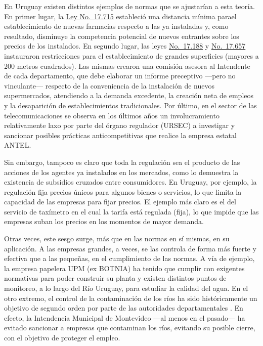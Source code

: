 \documentclass[
  12pt,
  spanish,
]{book}
\begin{document}
En Uruguay existen distintos ejemplos de normas que se ajustarían a esta teoría. En primer lugar, la \href{http://www.parlamento.gub.uy/leyes/AccesoTextoLey.asp?Ley=17715\&Anchor=}{Ley No.~17.715} estableció una distancia mínima parael establecimiento de nuevas farmacias respecto a las ya instaladas y, como resultado, disminuye la competencia potencial de nuevos entrantes sobre los precios de los instalados. En segundo lugar, las leyes \href{http://www.parlamento.gub.uy/leyes/AccesoTextoLey.asp?Ley=17188\&Anchor=}{No.~17.188} y \href{http://www.parlamento.gub.uy/leyes/AccesoTextoLey.asp?Ley=17657\&Anchor=}{No.~17.657} instauraron restricciones para el establecimiento de grandes superficies (mayores a 200 metros cuadrados). Las mismas crearon una comisión asesora al Intendente de cada departamento, que debe elaborar un informe preceptivo ---pero no vinculante--- respecto de la conveniencia de la instalación de nuevos supermercados, atendiendo a la demanda excedente, la creación neta de empleos y la desaparición de establecimientos tradicionales. Por último, en el sector de las telecomunicaciones se observa en los últimos años un involucramiento relativamente laxo por parte del órgano regulador (URSEC) a investigar y sancionar posibles prácticas anticompetitivas que realice la empresa estatal ANTEL.

Sin embargo, tampoco es claro que toda la regulación sea el producto de las acciones de los agentes ya instalados en los mercados, como lo demuestra la existencia de subsidios cruzados entre consumidores. En Uruguay, por ejemplo, la regulación fija precios únicos para algunos bienes o servicios, lo que limita la capacidad de las empresas para fijar precios. El ejemplo más claro es el del servicio de taxímetro en el cual la tarifa está regulada (fija), lo que impide que las empresas suban los precios en los momentos de mayor demanda.

Otras veces, este sesgo surge, más que en las normas en sí mismas, en su aplicación. A las empresas grandes, a veces, se las controla de forma más fuerte y efectiva que a las pequeñas, en el cumplimiento de las normas. A vía de ejemplo, la empresa papelera UPM (ex BOTNIA) ha tenido que cumplir con exigentes normativas para poder construir su planta y existen distintos puntos de monitoreo, a lo largo del Río Uruguay, para estudiar la calidad del agua. En el otro extremo, el control de la contaminación de los ríos ha sido históricamente un objetivo de segundo orden por parte de las autoridades departamentales \citep{Caffera2004}. En efecto, la Intendencia Municipal de Montevideo ---al menos en el pasado--- ha evitado sancionar a empresas que contaminan los ríos, evitando su posible cierre, con el objetivo de proteger el empleo.
\end{document}
